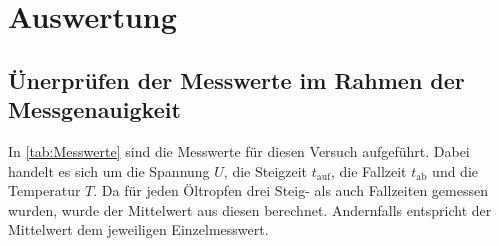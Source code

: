 \section{Auswertung}
\label{sec:Auswertung}

\subsection{Ünerprüfen der Messwerte im Rahmen der Messgenauigkeit}
In \ref{tab:Messwerte} sind die Messwerte für diesen Versuch aufgeführt. Dabei handelt es sich um die Spannung $U$, 
die Steigzeit $t_{\text{auf}}$, die Fallzeit $t_{\text{ab}}$ und die Temperatur $T$. Da für jeden Öltropfen drei Steig- als auch 
Fallzeiten gemessen wurden, wurde der Mittelwert aus diesen berechnet. Andernfalls entspricht der Mittelwert dem jeweiligen 
Einzelmesswert.


